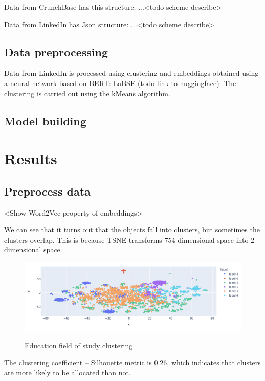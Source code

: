 \documentclass[12pt]{article}
\theoremstyle{plain}
\theoremstyle{definition}
\begin{document}
Data from CrunchBase has this structure: ...<todo scheme describe>

Data from LinkedIn has Json structure: ...<todo scheme describe>


\subsection{Data preprocessing}

Data from LinkedIn is processed using clustering and embeddings obtained using a neural network based on BERT: LaBSE (todo link to huggingface). The clustering is carried out using the kMeans algorithm.

\subsection{Model building}

\section{Results}

\subsection{Preprocess data}

<Show Word2Vec property of embeddings>

We can see that it turns out that the objects fall into clusters, but sometimes the clusters overlap. This is because TSNE transforms 754 dimensional space into 2 dimensional space. 

\begin{figure}[!h]
  \centering
  \includegraphics[width=160mm]{figures/paper/kMeans-9_03.png}
  \label{fig:gd}
  \caption{Education field of study clustering}
\end{figure}

The clustering coefficient -- Silhouette  metric is $0.26$, which indicates that clusters are more likely to be allocated than not.
\end{document}
